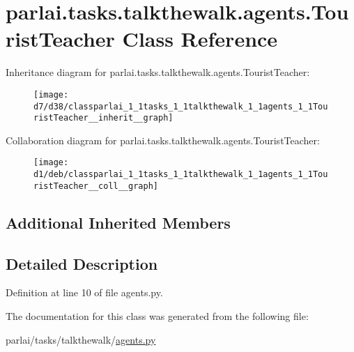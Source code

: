 \hypertarget{classparlai_1_1tasks_1_1talkthewalk_1_1agents_1_1TouristTeacher}{}\section{parlai.\+tasks.\+talkthewalk.\+agents.\+Tourist\+Teacher Class Reference}
\label{classparlai_1_1tasks_1_1talkthewalk_1_1agents_1_1TouristTeacher}


Inheritance diagram for parlai.\+tasks.\+talkthewalk.\+agents.\+Tourist\+Teacher\+:
\nopagebreak
\begin{figure}[H]
\begin{center}
\leavevmode
\texttt{[image: d7/d38/classparlai\_1\_1tasks\_1\_1talkthewalk\_1\_1agents\_1\_1TouristTeacher\_\_inherit\_\_graph]}
\end{center}
\end{figure}


Collaboration diagram for parlai.\+tasks.\+talkthewalk.\+agents.\+Tourist\+Teacher\+:
\nopagebreak
\begin{figure}[H]
\begin{center}
\leavevmode
\texttt{[image: d1/deb/classparlai\_1\_1tasks\_1\_1talkthewalk\_1\_1agents\_1\_1TouristTeacher\_\_coll\_\_graph]}
\end{center}
\end{figure}
\subsection*{Additional Inherited Members}


\subsection{Detailed Description}


Definition at line 10 of file agents.\+py.



The documentation for this class was generated from the following file\+:\begin{DoxyCompactItemize}
\item 
parlai/tasks/talkthewalk/\hyperlink{parlai_2tasks_2talkthewalk_2agents_8py}{agents.\+py}\end{DoxyCompactItemize}
